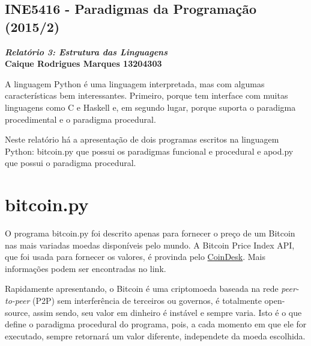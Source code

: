 \documentclass{article}
\begin{document}
\begin{center}
    \section*{INE5416 - Paradigmas da Programação (2015/2)}
    \textbf{\textit{Relatório 3: Estrutura das Linguagens} \\
    Caique Rodrigues Marques 13204303}
\end{center}

A linguagem Python é uma linguagem interpretada, mas com algumas características bem interessantes. Primeiro, porque tem interface com muitas linguagens como C e Haskell e, em segundo lugar, porque suporta o paradigma procedimental e o paradigma procedural.

Neste relatório há a apresentação de dois programas escritos na linguagem Python: bitcoin.py que possui os paradigmas funcional e procedural e apod.py que possui o paradigma procedural.

\section*{bitcoin.py}
O programa bitcoin.py foi descrito apenas para fornecer o preço de um Bitcoin nas mais variadas moedas disponíveis pelo mundo. A Bitcoin Price Index API, que foi usada para fornecer os valores, é provinda pelo \href{http://www.coindesk.com/api/}{CoinDesk}. Mais informações podem ser encontradas no link.

Rapidamente apresentando, o Bitcoin é uma criptomoeda baseada na rede \textit{peer-to-peer} (P2P) sem interferência de terceiros ou governos, é totalmente open-source, assim sendo, seu valor em dinheiro é instável e sempre varia. Isto é o que define o paradigma procedural do programa, pois, a cada momento em que ele for executado, sempre retornará um valor diferente, independete da moeda escolhida.
\end{document}
